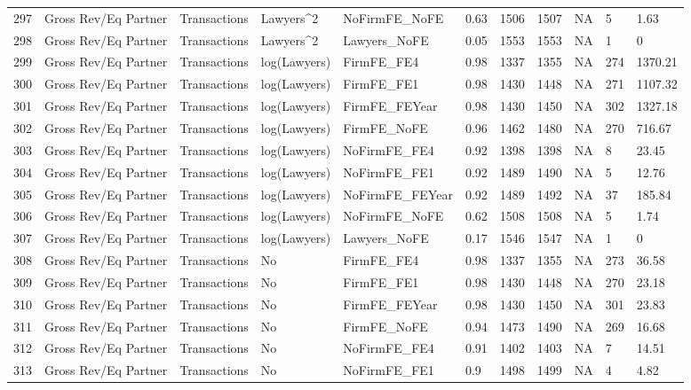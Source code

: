 \documentclass{article}
\begin{document}
\begin{table}[H]
\begin{tabular}{rllllllllll}
  297 & Gross Rev/Eq Partner & Transactions & Lawyers^2 & NoFirmFE\_NoFE & 0.63 & 1506 & 1507 & NA & 5 & 1.63 \\ 
  298 & Gross Rev/Eq Partner & Transactions & Lawyers^2 & Lawyers\_NoFE & 0.05 & 1553 & 1553 & NA & 1 & 0 \\ 
  299 & Gross Rev/Eq Partner & Transactions & log(Lawyers) & FirmFE\_FE4 & 0.98 & 1337 & 1355 & NA & 274 & 1370.21 \\ 
  300 & Gross Rev/Eq Partner & Transactions & log(Lawyers) & FirmFE\_FE1 & 0.98 & 1430 & 1448 & NA & 271 & 1107.32 \\ 
  301 & Gross Rev/Eq Partner & Transactions & log(Lawyers) & FirmFE\_FEYear & 0.98 & 1430 & 1450 & NA & 302 & 1327.18 \\ 
  302 & Gross Rev/Eq Partner & Transactions & log(Lawyers) & FirmFE\_NoFE & 0.96 & 1462 & 1480 & NA & 270 & 716.67 \\ 
  303 & Gross Rev/Eq Partner & Transactions & log(Lawyers) & NoFirmFE\_FE4 & 0.92 & 1398 & 1398 & NA & 8 & 23.45 \\ 
  304 & Gross Rev/Eq Partner & Transactions & log(Lawyers) & NoFirmFE\_FE1 & 0.92 & 1489 & 1490 & NA & 5 & 12.76 \\ 
  305 & Gross Rev/Eq Partner & Transactions & log(Lawyers) & NoFirmFE\_FEYear & 0.92 & 1489 & 1492 & NA & 37 & 185.84 \\ 
  306 & Gross Rev/Eq Partner & Transactions & log(Lawyers) & NoFirmFE\_NoFE & 0.62 & 1508 & 1508 & NA & 5 & 1.74 \\ 
  307 & Gross Rev/Eq Partner & Transactions & log(Lawyers) & Lawyers\_NoFE & 0.17 & 1546 & 1547 & NA & 1 & 0 \\ 
  308 & Gross Rev/Eq Partner & Transactions & No & FirmFE\_FE4 & 0.98 & 1337 & 1355 & NA & 273 & 36.58 \\ 
  309 & Gross Rev/Eq Partner & Transactions & No & FirmFE\_FE1 & 0.98 & 1430 & 1448 & NA & 270 & 23.18 \\ 
  310 & Gross Rev/Eq Partner & Transactions & No & FirmFE\_FEYear & 0.98 & 1430 & 1450 & NA & 301 & 23.83 \\ 
  311 & Gross Rev/Eq Partner & Transactions & No & FirmFE\_NoFE & 0.94 & 1473 & 1490 & NA & 269 & 16.68 \\ 
  312 & Gross Rev/Eq Partner & Transactions & No & NoFirmFE\_FE4 & 0.91 & 1402 & 1403 & NA & 7 & 14.51 \\ 
  313 & Gross Rev/Eq Partner & Transactions & No & NoFirmFE\_FE1 & 0.9 & 1498 & 1499 & NA & 4 & 4.82 \\ 

\end{tabular}
\end{table}
\end{document}
